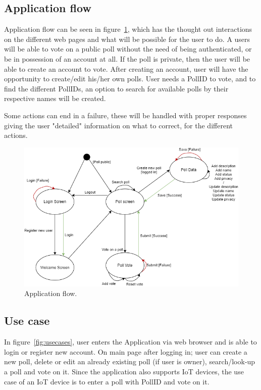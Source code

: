 \subsection{Application flow}
\label{sub:appflow}
Application flow can be seen in figure~\ref{fig:applicationflow}, which has the thought out interactions on the different web pages and what will be possible for the user to do. A users will be able to vote on a public poll without the need of being authenticated, or be in possession of an account at all. If the poll is private, then the user will be able to create an account to vote. After creating an account, user will have the opportunity to create/edit his/her own polls. User needs a PollID to vote, and to find the different PollIDs, an option to search for available polls by their respective names will be created. 

Some actions can end in a failure, these will be handled with proper responses giving the user "detailed" information on what to correct, for the different actions.
\begin{figure}[H]
  \centering
  \includegraphics[scale=0.5]{figs/applicationflow.png}
  \caption[scale=0.5]{Application flow.}
  \label{fig:applicationflow}
\end{figure}

\subsection{Use case}
\label{sub:usecase}
In figure~\ref{fig:usecases}, user enters the Application via web browser and is able to login or register new account. On main page after logging in; user can create a new poll, delete or edit an already existing poll (if user is owner), search/look-up a poll and vote on it. Since the application also supports IoT devices, the use case of an IoT device is to enter a poll with PollID and vote on it.

